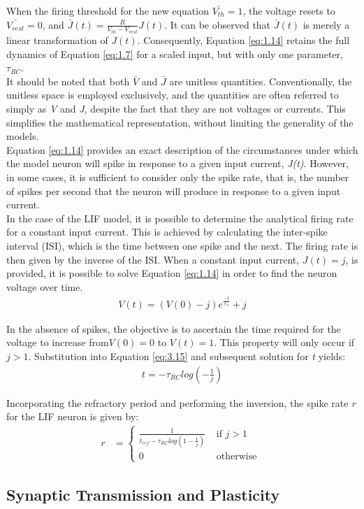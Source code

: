 \noindent When the firing threshold for the new equation $\bar{V_{th}} = 1$, the voltage resets to $\bar{V_{rest}} = 0$, and $\bar{J}(t) = \frac{R}{V_{th} - V_{rest}} J(t)$. It can be observed that $\bar{J}(t)$ is merely a linear transformation of $J(t)$. Consequently, Equation \ref{eq:1.14} retains the full dynamics of Equation \ref{eq:1.7} for a scaled input, but with only one parameter, $\tau_{RC}$. \\

\noindent It should be noted that both $\bar{V}$ and $\bar{J}$ are unitless quantities. Conventionally, the unitless space is employed exclusively, and the quantities are often referred to simply as \textit{V} and \textit{J}, despite the fact that they are not voltages or currents. This simplifies the mathematical representation, without limiting the generality of the models. \\

\noindent Equation \ref{eq:1.14} provides an exact description of the circumstances under which the model neuron will spike in response to a given input current, \textit{J(t)}. However, in some cases, it is sufficient to consider only the spike rate, that is, the number of spikes per second that the neuron will produce in response to a given input current. \\

\noindent In the case of the LIF model, it is possible to determine the analytical firing rate for a constant input current. This is achieved by calculating the inter-spike interval (ISI), which is the time between one spike and the next. The firing rate is then given by the inverse of the ISI. When a constant input current, $J(t) = j$, is provided, it is possible to solve Equation \ref{eq:1.14} in order to find the neuron voltage over time. 
\begin{align}
    V(t) = (V(0) - j)e^{\frac{-t}{\tau_{rc}}} + j \label{eq:1.15}
\end{align}

\noindent In the absence of spikes, the objective is to ascertain the time required for the voltage to increase from$ V(0) = 0$ to $V(t) = 1$. This property will only occur if $j > 1$. Substitution into Equation \ref{eq:3.15} and subsequent solution for \textit{t} yields:
\begin{align}
    t = - \tau_{RC} log \left( - \frac{1}{j} \right) \label{eq:1.16}
\end{align}

\noindent Incorporating the refractory period and performing the inversion, the spike rate \textit{r} for the LIF neuron is given by:
\begin{align}
    r &= \begin{cases}
    \frac{1}{t_{ref} - \tau_{RC} log \left( 1 - \frac{1}{j} \right)} & \text{ if } j > 1 \\ 
    0 & \text{ otherwise }  
    \end{cases} \label{eq:1.17}
\end{align}



\subsection[Synaptic Transmission and Plasticity]{Synaptic Transmission and Plasticity}

